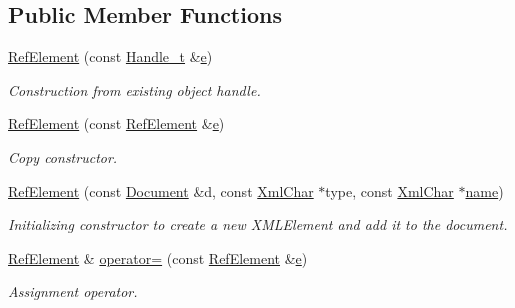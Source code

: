 \subsection*{Public Member Functions}
\begin{DoxyCompactItemize}
\item 
\hyperlink{class_d_d4hep_1_1_x_m_l_1_1_ref_element_a59a0e1ae7ebec907fd7df64528fcb654}{Ref\+Element} (const \hyperlink{class_d_d4hep_1_1_x_m_l_1_1_handle__t}{Handle\+\_\+t} \&\hyperlink{_volumes_8cpp_a8a9a1f93e9b09afccaec215310e64142}{e})
\begin{DoxyCompactList}\small\item\em Construction from existing object handle. \end{DoxyCompactList}\item 
\hyperlink{class_d_d4hep_1_1_x_m_l_1_1_ref_element_ab35b2b5265479d3876429a6b8a825a99}{Ref\+Element} (const \hyperlink{class_d_d4hep_1_1_x_m_l_1_1_ref_element}{Ref\+Element} \&\hyperlink{_volumes_8cpp_a8a9a1f93e9b09afccaec215310e64142}{e})
\begin{DoxyCompactList}\small\item\em Copy constructor. \end{DoxyCompactList}\item 
\hyperlink{class_d_d4hep_1_1_x_m_l_1_1_ref_element_ad49f3b5422b4070c2fbb04622e94a208}{Ref\+Element} (const \hyperlink{class_d_d4hep_1_1_x_m_l_1_1_document}{Document} \&d, const \hyperlink{namespace_d_d4hep_1_1_x_m_l_a09e5d9cc86ed782f6826dfe0778c1815}{Xml\+Char} $\ast$type, const \hyperlink{namespace_d_d4hep_1_1_x_m_l_a09e5d9cc86ed782f6826dfe0778c1815}{Xml\+Char} $\ast$\hyperlink{class_d_d4hep_1_1_x_m_l_1_1_ref_element_ace0e349adbfe709358d16fe2e5b1ecac}{name})
\begin{DoxyCompactList}\small\item\em Initializing constructor to create a new X\+M\+L\+Element and add it to the document. \end{DoxyCompactList}\item 
\hyperlink{class_d_d4hep_1_1_x_m_l_1_1_ref_element}{Ref\+Element} \& \hyperlink{class_d_d4hep_1_1_x_m_l_1_1_ref_element_a5af29e6f73c8b0e1aa23dff6dbe8b39d}{operator=} (const \hyperlink{class_d_d4hep_1_1_x_m_l_1_1_ref_element}{Ref\+Element} \&\hyperlink{_volumes_8cpp_a8a9a1f93e9b09afccaec215310e64142}{e})
\begin{DoxyCompactList}\small\item\em Assignment operator. \end{DoxyCompactList}\item 

\end{DoxyCompactItemize}
